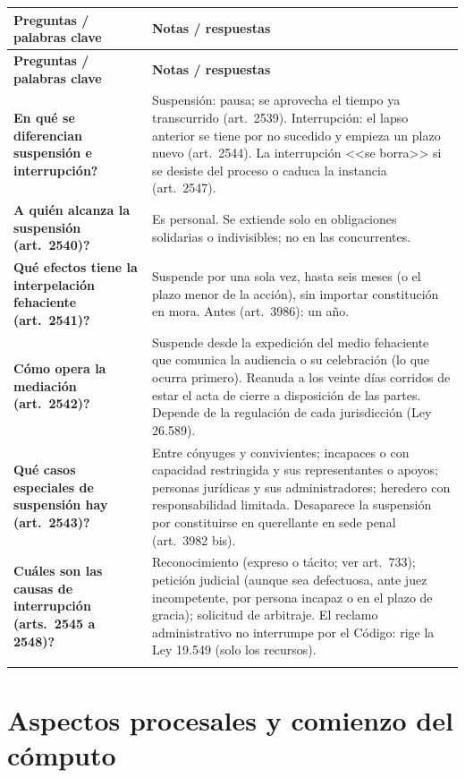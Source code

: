\documentclass[12pt,oneside]{book}
\newenvironment{cornell}{%
  \par\medskip\noindent
  \begin{longtable}{>{\raggedright\arraybackslash}p{0.25\textwidth}>{\raggedright\arraybackslash}p{0.69\textwidth}}
  \toprule
  \textbf{Preguntas / palabras clave} & \textbf{Notas / respuestas} \\
  \midrule
  \endfirsthead
  \toprule
  \textbf{Preguntas / palabras clave} & \textbf{Notas / respuestas} \\
  \midrule
  \endhead
}{%
  \bottomrule
  \end{longtable}
}
\newcommand{\cq}[2]{\textbf{#1} & #2 \\ \addlinespace[0.5em]}
\newcommand{\cresumen}[1]{\midrule \multicolumn{2}{p{0.94\textwidth}}{\textbf{Resumen:} #1} \\}
\begin{document}
\begin{cornell}
\cq{\textquestiondown En qu\'e se diferencian suspensi\'on e interrupci\'on?}{Suspensi\'on: pausa; se aprovecha el tiempo ya transcurrido (art.\ 2539). Interrupci\'on: el lapso anterior se tiene por no sucedido y empieza un plazo nuevo (art.\ 2544). La interrupci\'on <<se borra>> si se desiste del proceso o caduca la instancia (art.\ 2547).}
\cq{\textquestiondown A qui\'en alcanza la suspensi\'on (art.\ 2540)?}{Es personal. Se extiende solo en obligaciones solidarias o indivisibles; no en las concurrentes.}
\cq{\textquestiondown Qu\'e efectos tiene la interpelaci\'on fehaciente (art.\ 2541)?}{Suspende por una sola vez, hasta seis meses (o el plazo menor de la acci\'on), sin importar constituci\'on en mora. Antes (art.\ 3986): un a\~no.}
\cq{\textquestiondown C\'omo opera la mediaci\'on (art.\ 2542)?}{Suspende desde la expedici\'on del medio fehaciente que comunica la audiencia o su celebraci\'on (lo que ocurra primero). Reanuda a los veinte d\'ias corridos de estar el acta de cierre a disposici\'on de las partes. Depende de la regulaci\'on de cada jurisdicci\'on (Ley 26.589).}
\cq{\textquestiondown Qu\'e casos especiales de suspensi\'on hay (art.\ 2543)?}{Entre c\'onyuges y convivientes; incapaces o con capacidad restringida y sus representantes o apoyos; personas jur\'idicas y sus administradores; heredero con responsabilidad limitada. Desaparece la suspensi\'on por constituirse en querellante en sede penal (art.\ 3982 bis).}
\cq{\textquestiondown Cu\'ales son las causas de interrupci\'on (arts.\ 2545 a 2548)?}{Reconocimiento (expreso o t\'acito; ver art.\ 733); petici\'on judicial (aunque sea defectuosa, ante juez incompetente, por persona incapaz o en el plazo de gracia); solicitud de arbitraje. El reclamo administrativo no interrumpe por el C\'odigo: rige la Ley 19.549 (solo los recursos).}
\cresumen{La suspensi\'on pausa el reloj y se aprovecha el tiempo ya corrido; la interrupci\'on lo reinicia. Suspenden la interpelaci\'on fehaciente (una vez, seis meses), la mediaci\'on y los casos especiales del art.\ 2543; interrumpen el reconocimiento, la petici\'on judicial y el arbitraje. El efecto interruptivo se pierde por desistimiento o caducidad de instancia, y desaparece la suspensi\'on por querella penal.}
\end{cornell}

\chapter[Aspectos procesales y c\'omputo]{Aspectos procesales y comienzo del c\'omputo}
\end{document}
